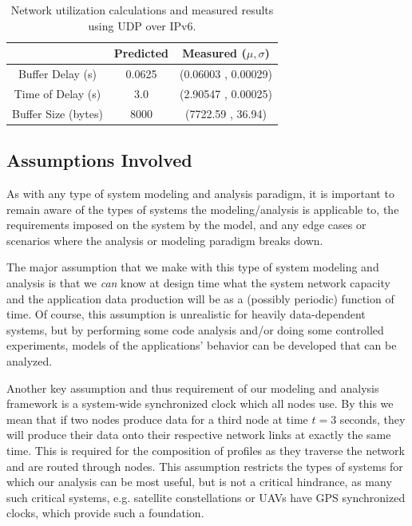 \begin{table}[htbp]
\caption{Network utilization calculations and measured results using UDP over IPv6.}
\begin{tabular}{| c | c | c |}
\hline
 & Predicted & Measured ($\mu,\sigma$) \\\hline
Buffer Delay (s) & 0.0625 & (0.06003 , 0.00029) \\\hline
Time of Delay (s) & 3.0 & (2.90547 , 0.00025) \\\hline
Buffer Size (bytes) & 8000 & (7722.59 , 36.94) \\\hline
\end{tabular}
\label{table:results}
\end{table}

\subsection{Assumptions Involved}
\label{subsec:assumptions}

As with any type of system modeling and analysis paradigm, it is
important to remain aware of the types of systems the
modeling/analysis is applicable to, the requirements imposed on the
system by the model, and any edge cases or scenarios where the
analysis or modeling paradigm breaks down.

The major assumption that we make with this type of system modeling
and analysis is that we \emph{can} know at design time what the system
network capacity and the application data production will be as a
(possibly periodic) function of time.  Of course, this assumption is
unrealistic for heavily data-dependent systems, but by performing some
code analysis and/or doing some controlled experiments, models of the
applications' behavior can be developed that can be analyzed.

Another key assumption and thus requirement of our modeling and
analysis framework is a system-wide synchronized clock which all nodes
use.  By this we mean that if two nodes produce data for a third node
at time $t=3$ seconds, they will produce their data onto their
respective network links at exactly the same time.  This is required
for the composition of profiles as they traverse the network and are
routed through nodes.  This assumption restricts the types of systems
for which our analysis can be most useful, but is not a critical
hindrance, as many such critical systems, e.g. satellite
constellations or UAVs have GPS synchronized clocks, which provide
such a foundation.

